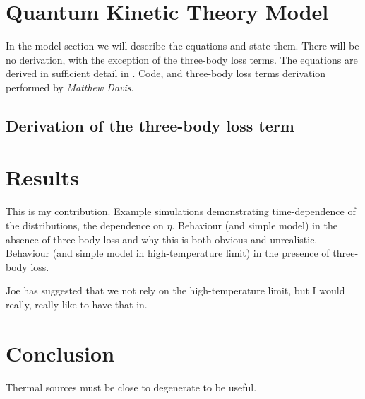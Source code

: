 \section{Quantum Kinetic Theory Model}
\label{KineticTheory:Model}
In the model section we will describe the equations and state them. There will be no derivation, with the exception of the three-body loss terms. The equations are derived in sufficient detail in \citep{Bijlsma:2000}. Code, and three-body loss terms derivation performed by \emph{Matthew Davis}.

\subsection{Derivation of the three-body loss term}
\label{KineticTheory:3BodyLoss}

\section{Results}
\label{KineticTheory:Results}
This is my contribution. Example simulations demonstrating time-dependence of the distributions, the dependence on $\eta$. Behaviour (and simple model) in the absence of three-body loss and why this is both obvious and unrealistic. Behaviour (and simple model in high-temperature limit) in the presence of three-body loss.

Joe has suggested that we not rely on the high-temperature limit, but I would really, really like to have that in.

\section{Conclusion}
Thermal sources must be close to degenerate to be useful. 